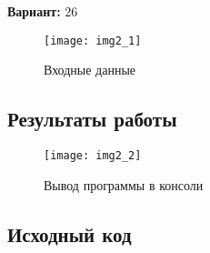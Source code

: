 {\bfseries Вариант:} 26

\begin{figure}[h!]
\centering
\texttt{[image: img2\_1]}
\caption{Входные данные}
\end{figure}

\subsection{Результаты работы}
\begin{figure}[h!]
\centering
\texttt{[image: img2\_2]}
\caption{Вывод программы в консоли}
\end{figure}

\pagebreak

\subsection{Исходный код}


